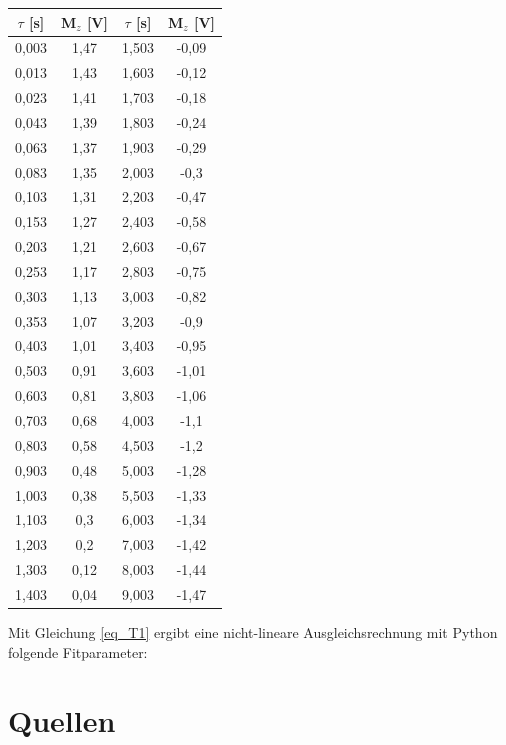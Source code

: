 \documentclass[]{scrartcl}
\begin{document}
\begin{center}
	\begin{tabular}{|c|c||c|c|}
		\hline	$\tau$ [s]	&	M$_z$ [V] & $\tau$ [s]	&	M$_z$ [V]\\
		\hline	0,003	&	1,47	&	1,503	&	-0,09	\\
		\hline	0,013	&	1,43	&	1,603	&	-0,12	\\
		\hline	0,023	&	1,41	&	1,703	&	-0,18	\\
		\hline	0,043	&	1,39	&	1,803	&	-0,24	\\
		\hline	0,063	&	1,37	&	1,903	&	-0,29	\\
		\hline	0,083	&	1,35	&	2,003	&	-0,3	\\
		\hline	0,103	&	1,31	&	2,203	&	-0,47	\\
		\hline	0,153	&	1,27	&	2,403	&	-0,58	\\
		\hline	0,203	&	1,21	&	2,603	&	-0,67	\\
		\hline	0,253	&	1,17	&	2,803	&	-0,75	\\
		\hline	0,303	&	1,13	&	3,003	&	-0,82	\\
		\hline	0,353	&	1,07	&	3,203	&	-0,9	\\
		\hline	0,403	&	1,01	&	3,403	&	-0,95	\\
		\hline	0,503	&	0,91	&	3,603	&	-1,01	\\
		\hline	0,603	&	0,81	&	3,803	&	-1,06	\\
		\hline	0,703	&	0,68	&	4,003	&	-1,1	\\
		\hline	0,803	&	0,58	&	4,503	&	-1,2	\\
		\hline	0,903	&	0,48	&	5,003	&	-1,28	\\
		\hline	1,003	&	0,38	&	5,503	&	-1,33	\\
		\hline	1,103	&	0,3	&	6,003	&	-1,34	\\
		\hline	1,203	&	0,2	&	7,003	&	-1,42	\\
		\hline	1,303	&	0,12	&	8,003	&	-1,44	\\
		\hline	1,403	&	0,04	&	9,003	&	-1,47	\\
		\hline
	\end{tabular}
	\label{tab_t1}
\end{center}
Mit Gleichung \ref{eq_T1} ergibt eine nicht-lineare Ausgleichsrechnung mit Python folgende Fitparameter:

		
\section{Quellen}
\end{document}

